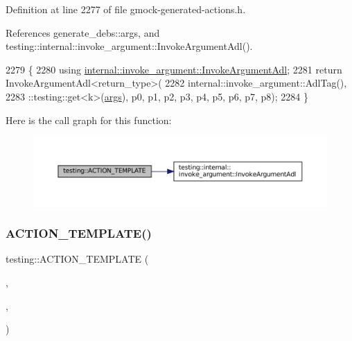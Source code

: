 Definition at line 2277 of file gmock-\/generated-\/actions.\+h.



References generate\+\_\+debs\+::args, and testing\+::internal\+::invoke\+\_\+argument\+::\+Invoke\+Argument\+Adl().


\begin{DoxyCode}
2279                                                                         \{
2280   \textcolor{keyword}{using} \hyperlink{namespacetesting_1_1internal_1_1invoke__argument_abd36164191a3e386c50243074854b272}{internal::invoke\_argument::InvokeArgumentAdl};
2281   \textcolor{keywordflow}{return} InvokeArgumentAdl<return\_type>(
2282       internal::invoke\_argument::AdlTag(),
2283       ::testing::get<k>(\hyperlink{namespacegenerate__debs_a75f9143e38df82d83b2e8a6f99cae02c}{args}), p0, p1, p2, p3, p4, p5, p6, p7, p8);
2284 \}
\end{DoxyCode}
Here is the call graph for this function\+:
\nopagebreak
\begin{figure}[H]
\begin{center}
\leavevmode
\includegraphics[width=350pt]{namespacetesting_a910551adbfeb1854071ef55ae54a5c0f_cgraph}
\end{center}
\end{figure}
\mbox{\label{namespacetesting_ab7bf885ff274cbdc09f19c39e43b7f2b}} 
\subsubsection{\texorpdfstring{A\+C\+T\+I\+O\+N\+\_\+\+T\+E\+M\+P\+L\+A\+T\+E()}{ACTION\_TEMPLATE()}\hspace{0.1cm}{\footnotesize\ttfamily [17/28]}}
{\footnotesize\ttfamily testing\+::\+A\+C\+T\+I\+O\+N\+\_\+\+T\+E\+M\+P\+L\+A\+TE (\begin{DoxyParamCaption}\item[{Invoke\+Argument}]{,  }\item[{H\+A\+S\+\_\+1\+\_\+\+T\+E\+M\+P\+L\+A\+T\+E\+\_\+\+P\+A\+R\+A\+MS(int, k)}]{,  }\item[{A\+N\+D\+\_\+10\+\_\+\+V\+A\+L\+U\+E\+\_\+\+P\+A\+R\+A\+MS(p0, p1, p2, p3, p4, p5, p6, p7, p8, p9)}]{ }\end{DoxyParamCaption})}



